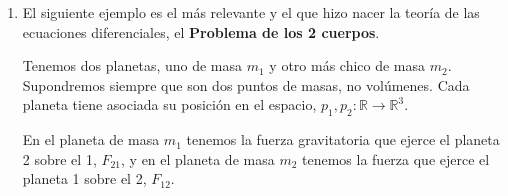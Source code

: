 \begin{ejemplo}
\begin{enumerate}
\begin{figure}[H]
\begin{tikzpicture}[scale=0.75]
                \end{tikzpicture}            
            \end{figure}
            \noindent
            Las fuerzas que están actuando sobre el paracaidista son:
            \begin{itemize}
                \item $F_1$, la fuerza del peso, que es constante:
                    \begin{equation*}
                        F_1 = mg
                    \end{equation*}
                \item $F_2$, la fueza de resistencia que hace el paracaidas, buscamos algo proporcional a la velocidad:
                    \begin{equation*}
                        F_2 = -k\dot{y}
                    \end{equation*}
                    Sin embargo, empíricamente se ve que ecuaciones lineales no son buenas para representar el rozamiento, por lo que lo consideraremos cuadrático:
                    \begin{equation*}
                        F_2 = -k|\dot{y}|\dot{y}
                    \end{equation*}
            \end{itemize}
            Obtenemos así finalmente la ecuación:
            \begin{equation*}
                m\ddot{y} = mg - k|\dot{y}|\dot{y}
            \end{equation*}
            Y sabemos que hay existencia y unicidad (puesto que es de clase 1).
        \item El siguiente ejemplo es el más relevante y el que hizo nacer la teoría de las ecuaciones diferenciales, el \textbf{Problema de los 2 cuerpos}.

            Tenemos dos planetas, uno de masa $m_1$ y otro más chico de masa $m_2$. Supondremos siempre que son dos puntos de masas, no volúmenes. Cada planeta tiene asociada su posición en el espacio, $p_1,p_2:\mathbb{R}\to \mathbb{R}^3$.

            En el planeta de masa $m_1$ tenemos la fuerza gravitatoria que ejerce el planeta 2 sobre el 1, $F_{21}$, y en el planeta de masa $m_2$ tenemos la fuerza que ejerce el planeta 1 sobre el 2, $F_{12}$.

            \begin{figure}[H]
                \centering
                \begin{tikzpicture}[scale=1]


\end{tikzpicture}
\end{figure}
\end{enumerate}
\end{ejemplo}
